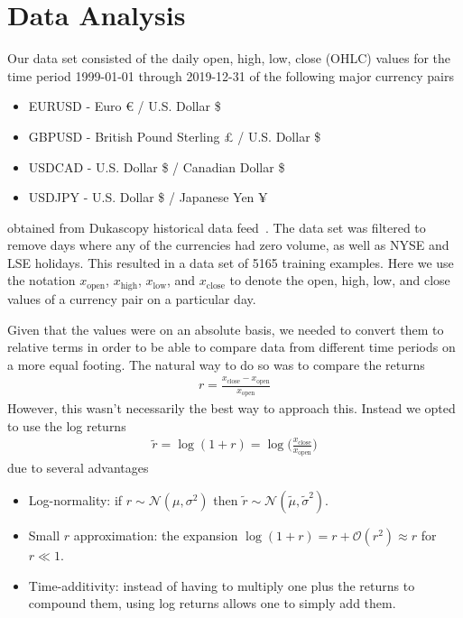 \section{Data Analysis}
Our data set consisted of the daily open, high, low, close (OHLC) values for the time period 1999-01-01 through 2019-12-31 of the following major currency pairs
\begin{itemize}
    \item EURUSD - Euro € / U.S. Dollar \$
    \item GBPUSD - British Pound Sterling £ / U.S. Dollar \$
    \item USDCAD - U.S. Dollar \$ / Canadian Dollar \$
    \item USDJPY - U.S. Dollar \$ / Japanese Yen ¥
\end{itemize}
obtained from Dukascopy historical data feed~\cite{dukascopy}.
The data set was filtered to remove days where any of the currencies had zero volume, as well as NYSE and LSE holidays.
This resulted in a data set of 5165 training examples.
Here we use the notation \( x_\text{open} \), \( x_\text{high} \), \( x_\text{low} \), and \( x_\text{close} \) to denote the open, high, low, and close values of a currency pair on a particular day.

Given that the values were on an absolute basis, we needed to convert them to relative terms in order to be able to compare data from different time periods on a more equal footing.
The natural way to do so was to compare the returns
\begin{align}
    r = \frac{x_\text{close} - x_\text{open}}{x_\text{open}}
\end{align}
However, this wasn't necessarily the best way to approach this.
Instead we opted to use the log returns
\begin{align}
    \tilde{r}
        = \log(1+r)
        = \log\bigg( \frac{x_\text{close}}{x_\text{open}} \bigg)
\end{align}
due to several advantages~\cite{quantivity_2012}
\begin{itemize}
    \item Log-normality: if \( r \sim \mathcal{N}(\mu, \sigma^2) \) then \( \tilde{r} \sim \mathcal{N}(\tilde{\mu}, \tilde{\sigma}^2) \).
    \item Small \( r \) approximation: the expansion \( \log (1 + r) = r + \mathcal{O}(r^2) \approx r \) for \( r \ll 1 \).
    \item Time-additivity: instead of having to multiply one plus the returns to compound them, using log returns allows one to simply add them.
\end{itemize}

